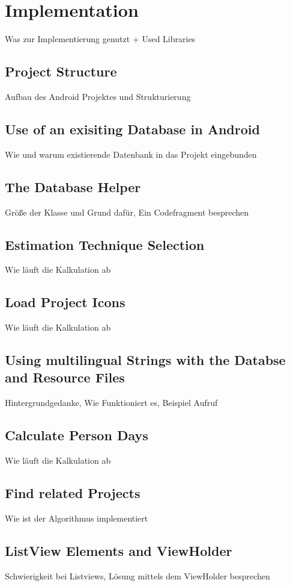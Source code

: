 \chapter{Implementation}

Was zur Implementierung genutzt + Used Libraries


\section{Project Structure}

Aufbau des Android Projektes und Strukturierung

\section{Use of an exisiting Database in Android}\label{exDB}

Wie und warum existierende Datenbank in das Projekt eingebunden

\section{The Database Helper}

Größe der Klasse und Grund dafür, Ein Codefragment besprechen

\section{Estimation Technique Selection}\label{impl:estMethodSelection}

Wie läuft die Kalkulation ab

\section{Load Project Icons}\label{impl:loadProjectIcons}

Wie läuft die Kalkulation ab

\section{Using multilingual Strings with the Databse and Resource Files}

Hintergrundgedanke, Wie Funktioniert es, Beispiel Aufruf

\section{Calculate Person Days}

Wie läuft die Kalkulation ab

\section{Find related Projects}

Wie ist der Algorithmus implementiert

\section{ListView Elements and ViewHolder}

Schwierigkeit bei Listviews, Lösung mittels dem ViewHolder besprechen


